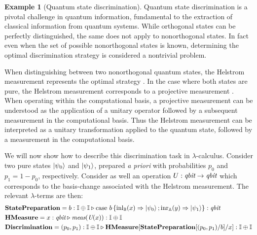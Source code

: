 \documentclass[10pt,a4paper]{amsart}
\theoremstyle{definition}
\theoremstyle{definition}
\newtheorem{example}[definition]{Example}
\theoremstyle{definition}
\theoremstyle{definition}
\theoremstyle{definition}
\theoremstyle{definition}
\begin{document}
\begin{example}[Quantum state discrimination]

Quantum state discrimination is a pivotal challenge in quantum information,
fundamental to the extraction of classical information from quantum systems.
While orthogonal states can be perfectly distinguished, the same does not apply
to nonorthogonal states. In fact even when the set of possible nonorthogonal
states is known, determining the optimal discrimination strategy is considered
a nontrivial problem.

When distinguishing between two nonorthogonal quantum states, the Helstrom
measurement represents the optimal strategy
\cite{helstromQuantumDetectionEstimation1976}. In the case where both states
are pure, the Helstrom measurement corresponds to a projective measurement
\cite{barnett2009quantum}.  When operating within the computational basis, a
projective measurement can be understood as the application of a unitary
operator followed by a subsequent measurement in the computational basis. Thus
the Helstrom measurement can be interpreted as a unitary transformation applied
to the quantum state, followed by a measurement in the computational basis. 

We will now show how to describe this discrimination task in
$\lambda$-calculus.  Consider two pure states $\ket{\psi_0}$ and
$\ket{\psi_1}$, prepared \emph{a priori} with probabilities $p_0$ and $p_1 = 1-p_0$,
respectively. Consider as well an operation $U : \emph{qbit} \to \emph{qbit}$ which
corresponds to the basis-change associated with the Helstrom measurement.
The relevant $\lambda$-terms are then:
\begin{align*}
  &\textbf{StatePreparation} =  b: \mathbb{I} \oplus \mathbb{I}  \triangleright  \text{case } b\,
  \{\mathrm{inl}_{\mathbb{B}}(x) \Rightarrow \ket{\psi_0} ; \mathrm{inr}_{\mathbb{A}}(y) \Rightarrow \ket{\psi_1}\}: \textit{qbit} \\
  &\textbf{HMeasure} =  x : \emph{qbit} \triangleright \emph{meas} (\emph{U}(x)): \mathbb{I} \oplus \mathbb{I} \\
  &\textbf{Discrimination} = (p_0,p_1): \mathbb{I}\oplus \mathbb{I} \triangleright \textbf{HMeasure} [ \textbf{StatePreparation} [(p_0,p_1)/ b] / x] : \mathbb{I}\oplus \mathbb{I}
\end{align*}
\end{example}
\end{document}
